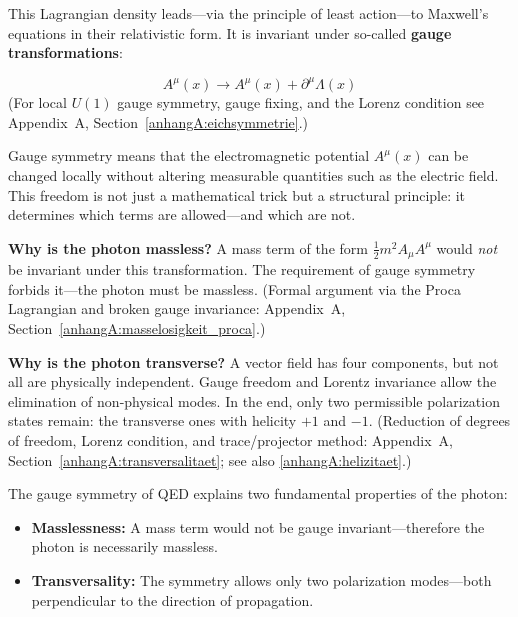 This Lagrangian density leads—via the principle of least action—to Maxwell’s equations in their relativistic form.
It is invariant under so-called \textbf{gauge transformations}:

\[
A^\mu(x) \rightarrow A^\mu(x) + \partial^\mu \Lambda(x)
\]
(For local \(U(1)\) gauge symmetry, gauge fixing, and the Lorenz condition see Appendix~A, Section~\ref{anhangA:eichsymmetrie}.)
\vspace{1em}
\begin{tcolorbox}[physikbox, title=What Does Gauge Symmetry Mean?]
	\label{box:was bedeutet Eichsy}
	\small
	Gauge symmetry means that the electromagnetic potential \( A^\mu(x) \) can be changed locally without altering measurable quantities such as the electric field. This freedom is not just a mathematical trick but a structural principle: it determines which terms are allowed—and which are not.
\end{tcolorbox}

\textbf{Why is the photon massless?}
A mass term of the form \( \frac{1}{2} m^2 A_\mu A^\mu \) would \emph{not} be invariant under this transformation. The requirement of gauge symmetry forbids it—the photon must be massless.
(Formal argument via the Proca Lagrangian and broken gauge invariance: Appendix~A, Section~\ref{anhangA:masselosigkeit_proca}.)

\textbf{Why is the photon transverse?}
A vector field has four components, but not all are physically independent. Gauge freedom and Lorentz invariance allow the elimination of non-physical modes. In the end, only two permissible polarization states remain: the transverse ones with helicity \( +1 \) and \( -1 \).
(Reduction of degrees of freedom, Lorenz condition, and trace/projector method: Appendix~A, Section~\ref{anhangA:transversalitaet}; see also \ref{anhangA:helizitaet}.)

\vspace{1em}
\begin{tcolorbox}[physikbox, title=Consequences of Gauge Symmetry]
	\label{box:folgen der Eichsy}
	\small
	The gauge symmetry of QED explains two fundamental properties of the photon:
	
	\begin{itemize}
		\item \textbf{Masslessness:} A mass term would not be gauge invariant—therefore the photon is necessarily massless.
		\item \textbf{Transversality:} The symmetry allows only two polarization modes—both perpendicular to the direction of propagation.
	\end{itemize}
\end{tcolorbox}

